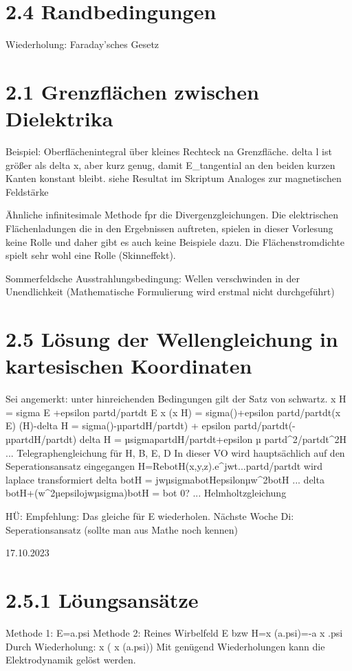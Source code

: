 \documentclass[a4paper]{article}
\begin{document}
\section{2.4 Randbedingungen}
Wiederholung: Faraday'sches Gesetz

\section{2.1 Grenzflächen zwischen Dielektrika}
Beispiel: Oberflächenintegral über kleines Rechteck na Grenzfläche.
        delta l ist größer als delta x, aber kurz genug, damit E_tangential an
        den beiden kurzen Kanten konstant bleibt.
    siehe Resultat im Skriptum
Analoges zur magnetischen Feldstärke

Ähnliche infinitesimale Methode fpr die Divergenzgleichungen.
Die elektrischen Flächenladungen die in den Ergebnissen auftreten, spielen in
dieser Vorlesung keine Rolle und daher gibt es auch keine Beispiele dazu.
Die Flächenstromdichte spielt sehr wohl eine Rolle (Skinneffekt).

Sommerfeldsche Ausstrahlungsbedingung: Wellen verschwinden in der Unendlichkeit
        (Mathematische Formulierung wird erstmal nicht durchgeführt)

\section{2.5 Lösung der Wellengleichung in kartesischen Koordinaten}
Sei angemerkt: unter hinreichenden Bedingungen  gilt der Satz von schwartz.
\nabla x H = sigma E +epsilon partd/partdt E
\nabla x (\nabla x H) = sigma(\nablaxE)+epsilon partd/partdt(\nabla x E)
\nabla(\nabla H)-delta H = sigma()-µpartdH/partdt) + epsilon partd/partdt(-µpartdH/partdt)
delta H = µsigmapartdH/partdt+epsilon µ partd^2/partdt^2H          ... Telegraphengleichung für H, B, E, D
In dieser VO wird hauptsächlich auf den Seperationsansatz eingegangen
H=Re{botH(x,y,z).e^jwt}...partd/partdt wird laplace transformiert
delta botH = jwµsigmabotHepsilonµw^2botH ... delta botH+(w^2µepsilojwµsigma)botH = bot 0? ... Helmholtzgleichung

HÜ: Empfehlung: Das gleiche für E wiederholen.
Nächste Woche Di: Seperationsansatz (sollte man aus Mathe noch kennen)

17.10.2023
\section{2.5.1 Löungsansätze}
Methode 1: E=a.psi
Methode 2:
    Reines Wirbelfeld E bzw H=\nabla x (a.psi)=-a x \nabla.psi
    Durch Wiederholung: \nabla x ( \nabla x (a.psi))
    Mit genügend Wiederholungen kann die Elektrodynamik gelöst werden.
\end{document}

